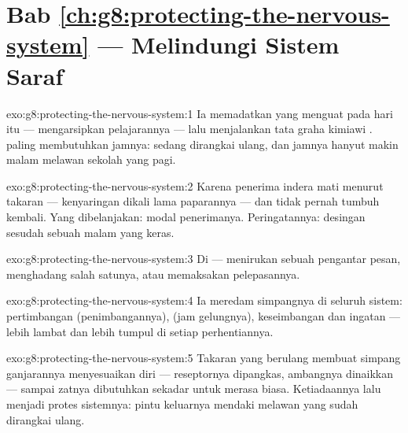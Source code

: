 \section*{Bab \ref{ch:g8:protecting-the-nervous-system} --- Melindungi Sistem Saraf}

\begin{solution}{exo:g8:protecting-the-nervous-system:1}
Ia memadatkan  yang menguat pada hari itu ---
mengarsipkan pelajarannya --- lalu menjalankan tata graha
kimiawi .   paling membutuhkan jamnya:
sedang dirangkai ulang, dan jamnya hanyut makin malam
melawan sekolah yang pagi.
\end{solution}

\begin{solution}{exo:g8:protecting-the-nervous-system:2}
Karena penerima indera  mati menurut takaran ---
kenyaringan dikali lama paparannya --- dan tidak pernah
tumbuh kembali. Yang dibelanjakan: modal penerimanya.
Peringatannya: desingan sesudah sebuah malam yang keras.
\end{solution}

\begin{solution}{exo:g8:protecting-the-nervous-system:3}
Di  --- menirukan sebuah pengantar pesan,
menghadang salah satunya, atau memaksakan pelepasannya.
\end{solution}

\begin{solution}{exo:g8:protecting-the-nervous-system:4}
Ia meredam simpangnya di seluruh sistem: pertimbangan
(penimbangannya),  (jam gelungnya), keseimbangan
dan ingatan --- lebih lambat dan lebih tumpul di setiap
perhentiannya.
\end{solution}

\begin{solution}{exo:g8:protecting-the-nervous-system:5}
Takaran yang berulang membuat simpang ganjarannya
menyesuaikan diri --- reseptornya dipangkas, ambangnya
dinaikkan --- sampai zatnya dibutuhkan sekadar untuk merasa
biasa. Ketiadaannya lalu menjadi protes sistemnya: pintu
keluarnya mendaki melawan  yang sudah dirangkai ulang.
\end{solution}

